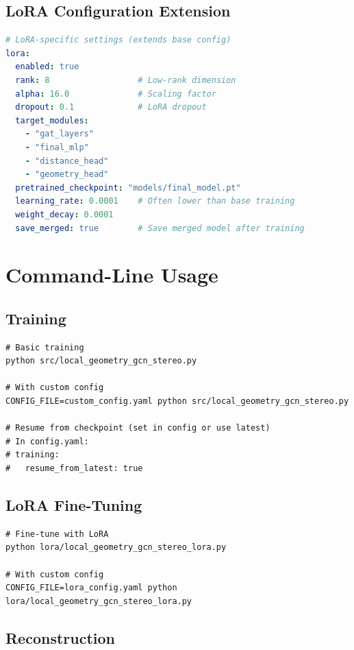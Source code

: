 \documentclass[11pt,a4paper]{article}
\begin{document}
\subsection{LoRA Configuration Extension}

\begin{lstlisting}[language=yaml,caption={LoRA Configuration}]
# LoRA-specific settings (extends base config)
lora:
  enabled: true
  rank: 8                  # Low-rank dimension
  alpha: 16.0              # Scaling factor
  dropout: 0.1             # LoRA dropout
  target_modules:
    - "gat_layers"
    - "final_mlp"
    - "distance_head"
    - "geometry_head"
  pretrained_checkpoint: "models/final_model.pt"
  learning_rate: 0.0001    # Often lower than base training
  weight_decay: 0.0001
  save_merged: true        # Save merged model after training
\end{lstlisting}

\section{Command-Line Usage}

\subsection{Training}

\begin{verbatim}
# Basic training
python src/local_geometry_gcn_stereo.py

# With custom config
CONFIG_FILE=custom_config.yaml python src/local_geometry_gcn_stereo.py

# Resume from checkpoint (set in config or use latest)
# In config.yaml:
# training:
#   resume_from_latest: true
\end{verbatim}

\subsection{LoRA Fine-Tuning}

\begin{verbatim}
# Fine-tune with LoRA
python lora/local_geometry_gcn_stereo_lora.py

# With custom config
CONFIG_FILE=lora_config.yaml python lora/local_geometry_gcn_stereo_lora.py
\end{verbatim}

\subsection{Reconstruction}
\end{document}

